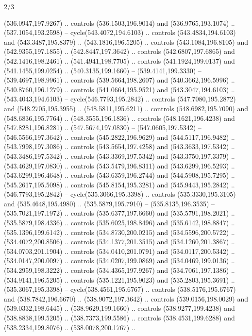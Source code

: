 \begin{flagdescription}{2/3}
\begin{scope}[xshift=0.5\flaglength,yshift=0.5\flagwidth,scale=\flagwidth/495.65]
\begin{scope}[y=0.8pt, x=0.8pt, yscale=-1,shift={(-463.76,-309.78)}]
  (536.0947,197.9267) .. controls (536.1503,196.9014) and (536.9765,193.1074) ..
  (537.1054,193.2598) -- cycle(543.4072,194.6103) .. controls
  (543.4834,194.6103) and (543.3487,195.8379) .. (543.1816,196.5205) .. controls
  (543.1084,196.8105) and (542.9355,197.1855) .. (542.8447,197.3642) .. controls
  (542.6807,197.6865) and (542.1416,198.2461) .. (541.4941,198.7705) .. controls
  (541.1924,199.0137) and (541.1455,199.0254) .. (540.3135,199.1660) --
  (539.4141,199.3330) -- (539.4697,198.9961) .. controls (539.5664,198.2607) and
  (540.3662,196.5996) .. (540.8760,196.1279) .. controls (541.0664,195.9521) and
  (543.3047,194.6103) .. (543.4043,194.6103) -- cycle(546.7793,195.2842) ..
  controls (547.7080,195.2872) and (548.2705,195.3955) .. (548.5811,195.6211) ..
  controls (548.6982,195.7090) and (548.6836,195.7764) .. (548.3555,196.1836) ..
  controls (548.1621,196.4238) and (547.8281,196.8281) .. (547.5674,197.0830) --
  (547.0605,197.5342) -- (546.5566,197.3642) .. controls (545.2822,196.9629) and
  (544.5117,196.9482) .. (543.7998,197.3086) .. controls (543.5654,197.4258) and
  (543.3633,197.5342) .. (543.3486,197.5342) .. controls (543.3369,197.5342) and
  (543.3750,197.3379) .. (543.4629,197.0830) .. controls (543.5479,196.8311) and
  (543.6299,196.5293) .. (543.6299,196.4648) .. controls (543.6359,196.2744) and
  (544.5908,195.7295) .. (545.2617,195.5098) .. controls (545.8154,195.3281) and
  (545.9443,195.2842) .. (546.7793,195.2842) -- cycle(535.3066,195.3398) ..
  controls (535.3330,195.3105) and (535.4648,195.4980) .. (535.5879,195.7910) --
  (535.8135,196.3535) -- (535.7021,197.1972) .. controls (535.6377,197.6660) and
  (535.5791,198.2021) .. (535.5879,198.4336) .. controls (535.6025,198.8496) and
  (535.6142,198.8847) .. (535.1396,199.6142) .. controls (534.8730,200.0215) and
  (534.5596,200.5722) .. (534.4072,200.8506) .. controls (534.1377,201.3515) and
  (534.1260,201.3867) .. (534.0703,201.1904) .. controls (534.0410,201.0791) and
  (534.0117,200.5342) .. (534.0147,200.0097) .. controls (534.0207,199.0869) and
  (534.0469,199.0136) .. (534.2959,198.3222) .. controls (534.4365,197.9267) and
  (534.7061,197.1386) .. (534.9141,196.5205) .. controls (535.1221,195.9023) and
  (535.2803,195.3691) .. (535.3067,195.3398) -- cycle(538.4561,195.6767) ..
  controls (538.5176,195.6767) and (538.7842,196.6670) .. (538.9072,197.3642) ..
  controls (539.0156,198.0029) and (539.0332,198.6445) .. (538.9629,199.1660) ..
  controls (538.9277,199.4238) and (538.8838,199.5205) .. (538.7373,199.5586) ..
  controls (538.4531,199.6288) and (538.2334,199.8076) .. (538.0078,200.1767) ..

\end{scope}
\end{scope}
\end{flagdescription}
